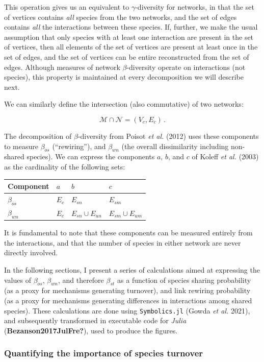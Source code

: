 \documentclass[11pt]{article}
\begin{document}
This operation gives us an equivalent to \(\gamma\)-diversity for
networks, in that the set of vertices contains \emph{all} species from
the two networks, and the set of edges contains \emph{all} the
interactions between these species. If, further, we make the usual
assumption that only species with at least one interaction are present
in the set of vertices, then all elements of the set of vertices are
present at least once in the set of edges, and the set of vertices can
be entire reconstructed from the set of edges. Although measures of
network \(\beta\)-diversity operate on interactions (not species), this
property is maintained at every decomposition we will describe next.

We can similarly define the intersection (also commutative) of two
networks:

\[\mathcal{M} \cap \mathcal{N} = (V_c, E_c)\,.\]

The decomposition of \(\beta\)-diversity from Poisot \emph{et al.}
(2012) uses these components to measure \(\beta_{os}\) (``rewiring''),
and \(\beta_{wn}\) (the overall dissimilarity including non-shared
species). We can express the components \(a\), \(b\), and \(c\) of
Koleff \emph{et al.} (2003) as the cardinality of the following sets:

\begin{longtable}[]{@{}llll@{}}
\toprule
Component & \(a\) & \(b\) & \(c\)\tabularnewline
\midrule
\endhead
\(\beta_{os}\) & \(E_c\) & \(E_{sn}\) & \(E_{sm}\)\tabularnewline
\(\beta_{wn}\) & \(E_c\) & \(E_{sn} \cup E_{un}\) &
\(E_{sm} \cup E_{um}\)\tabularnewline
\bottomrule
\end{longtable}

It is fundamental to note that these components can be measured entirely
from the interactions, and that the number of species in either network
are never directly involved.

In the following sections, I present a series of calculations aimed at
expressing the values of \(\beta_{os}\), \(\beta_{wn}\), and therefore
\(\beta_{st}\) as a function of species sharing probability (as a proxy
for mechanisms generating turnover), and link rewiring probability (as a
proxy for mechanisms generating differences in interactions among shared
species). These calculations are done using \texttt{Symbolics.jl} (Gowda
\emph{et al.} 2021), and subsequently transformed in executable code for
\emph{Julia} (\textbf{Bezanson2017JulFre?}), used to produce the
figures.

\hypertarget{quantifying-the-importance-of-species-turnover}{%
\subsubsection{Quantifying the importance of species
turnover}\label{quantifying-the-importance-of-species-turnover}}
\end{document}
